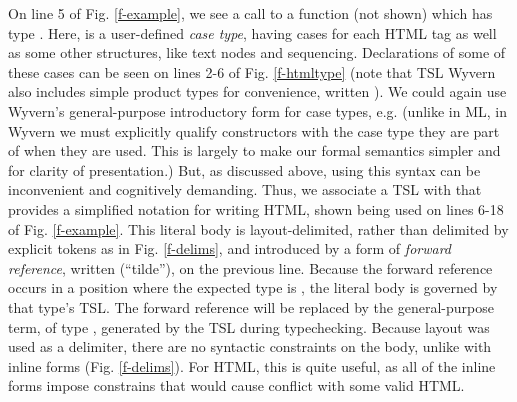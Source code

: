 On line 5 of Fig. \ref{f-example}, we see a call to a function  (not shown) which has type . Here,  is a user-defined \emph{case type}, having cases for each HTML tag as well as some other structures, like text nodes and sequencing. Declarations  of some of these cases can be seen on lines 2-6 of Fig. \ref{f-htmltype} (note that TSL Wyvern also includes simple product types for convenience, written ). We could again use Wyvern's general-purpose introductory form for case types, e.g.  ({unlike in ML, in Wyvern we must explicitly qualify constructors with the case type they are part of when they are used}. This is largely to make our formal semantics simpler and for clarity of presentation.) But, as discussed above, using this syntax can be inconvenient and  cognitively demanding. Thus, we associate a TSL with  that provides a simplified notation for writing HTML, shown being used on lines 6-18 of Fig. \ref{f-example}. This literal body is layout-delimited, rather than delimited by explicit tokens as in Fig. \ref{f-delims}, and introduced by a form of \emph{forward reference}, written \li{~} (``tilde''), on the previous line. Because the forward reference occurs in a position where the expected type is , the literal body is governed by that type's TSL. The forward reference will be replaced by the general-purpose term, of type , generated by the TSL during typechecking. Because layout was used as a delimiter, there are no syntactic constraints on the body, unlike with inline forms (Fig. \ref{f-delims}). For HTML, this is quite useful, as all of the inline forms impose constrains that would cause conflict with some valid HTML.
